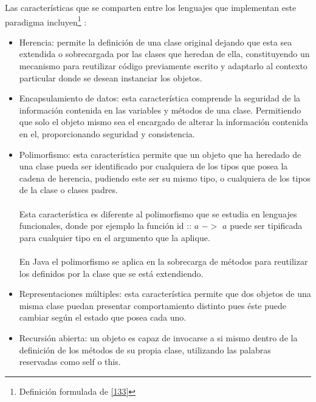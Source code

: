 \bigskip

Las características que se comparten entre los lenguajes que implementan este paradigma incluyen\footnote{Definición formulada de \hyperlink{133}{[133]}} :
\bigskip

\begin{itemize}
    \item Herencia:
	 permite la definición de una clase original dejando que esta sea extendida o sobrecargada por las clases que heredan de ella, constituyendo un mecanismo para reutilizar código previamente escrito y adaptarlo al contexto particular donde se desean instanciar los objetos.\\

    \item Encapsulamiento de datos: esta característica comprende la seguridad de la información contenida en las variables y métodos de una clase. Permitiendo que solo el objeto mismo sea el encargado de alterar la información contenida en el, proporcionando seguridad y consistencia.\\

    \item  Polimorfismo: esta característica permite que un objeto que ha heredado de una clase pueda ser identificado por cualquiera de los tipos que posea la cadena de herencia, pudiendo este ser su mismo tipo, o cualquiera de los tipos de la clase o clases padres.\\\\
Esta característica es diferente al polimorfismo que se estudia en lenguajes funcionales, donde por ejemplo la función \textsf{id} :: $a$ $->$ $a$ puede ser tipificada para cualquier tipo en el argumento que la aplique.\\\\
 En Java el polimorfismo se aplica en la sobrecarga de métodos para reutilizar los definidos por la clase que se está extendiendo.\\

    \item  Representaciones múltiples: esta característica permite que dos objetos de una misma clase puedan presentar comportamiento distinto pues éste puede cambiar según el estado que posea cada uno.\\

    \item Recursión abierta: un objeto es capaz de invocarse a si mismo dentro de la definición de los métodos de su propia clase, utilizando las palabras reservadas como \textsf{self} o \textsf{this}.
\end{itemize}


